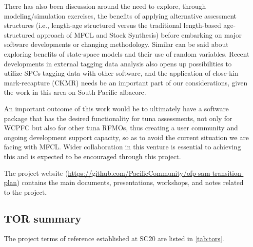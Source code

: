 \documentclass{SCreport}
\newcommand\ofpsam{https://github.com/PacificCommunity/ofp-sam}
\begin{document}
There has also been discussion around the need to explore, through
modeling/simulation exercises, the benefits of applying alternative assessment
structures (i.e., length-age structured versus the traditional length-based
age-structured approach of MFCL and Stock Synthesis) before embarking on major
software developments or changing methodology. Similar can be said about
exploring benefits of state-space models and their use of random variables.
Recent developments in external tagging data analysis also opens up
possibilities to utilize SPCs tagging data with other software, and the
application of close-kin mark-recapture (CKMR) needs be an important part of our
considerations, given the work in this area on South Pacific albacore.

An important outcome of this work would be to ultimately have a software package
that has the desired functionality for tuna assessments, not only for WCPFC but
also for other tuna RFMOs, thus creating a user community and ongoing
development support capacity, so as to avoid the current situation we are facing
with MFCL. Wider collaboration in this venture is essential to achieving this
and is expected to be encouraged through this project.

The project website (\href{\ofpsam-transition-plan}{\ofpsam-transition-plan})
contains the main documents, presentations, workshops, and notes related to the
project.

\vspace{2ex}

\subsection{TOR summary}

The project terms of reference established at SC20 are listed in
\autoref{tab:tors}.

\newpage
\end{document}
